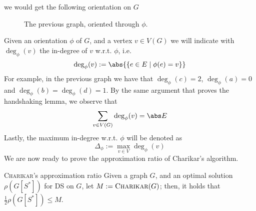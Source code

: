 \documentclass[a4paper, 12pt]{report}
\begin{document}
    we would get the following orientation on $G$

    \begin{figure}[H]
        \centering
        \caption{The previous graph, oriented through $\phi$.}
        \label{oriented graph}
    \end{figure}

    Given an orientation $\phi$ of $G$, and a vertex $v \in V(G)$ we will indicate with $\deg_\phi(v)$ the in-degree of $v$ w.r.t. $\phi$, i.e. $$\deg_\phi(v) := \abs{\{e \in E \mid \phi(e) = v\}}$$ For example, in the previous graph we have that $\deg_\phi(c) = 2$, $\deg_\phi(a) = 0$ and $\deg_\phi(b) = \deg_\phi(d) = 1$. By the same argument that proves the handshaking lemma, we observe that $$\sum_{v \in V(G)}{\deg_\phi(v)} = \abs E$$ Lastly, the maximum in-degree w.r.t. $\phi$ will be denoted as $$\Delta_\phi := \max_{v \in V} {\deg_\phi(v)}$$ We are now ready to prove the approximation ratio of Charikar's algorithm.

    \begin{framedthm}[label={charikar approx}]{\textsc{Charikar}'s approximation ratio}
        Given a graph $G$, and an optimal solution $\rho(G[S^*])$ for DS on $G$, let $M := \textsc{Charikar}(G)$; then, it holds that $\tfrac{1}{2} \rho(G[S^*]) \le M$.
    \end{framedthm}
\end{document}
